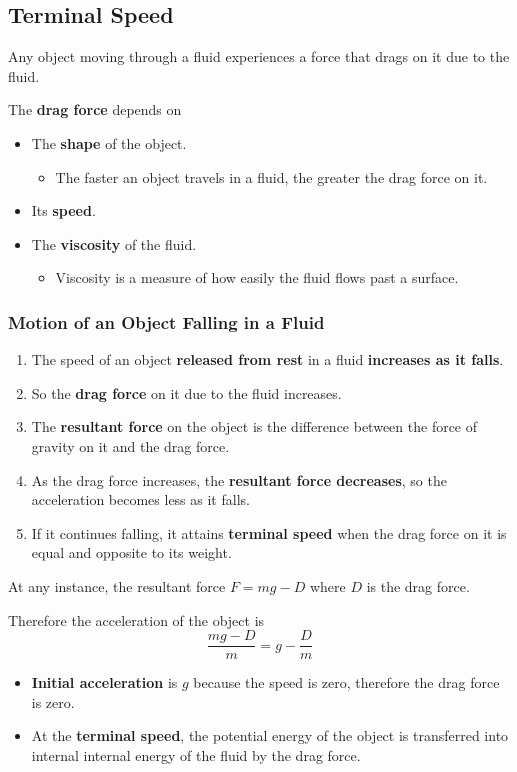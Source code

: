 \subsection{Terminal Speed}

Any object moving through a fluid experiences a force that drags on it due to the fluid.

The \textbf{drag force} depends on
\begin{itemize}
    \item The \textbf{shape} of the object.
        \begin{itemize}
            \item The faster an object travels in a fluid, the greater the drag force on it.
        \end{itemize}
    \item Its \textbf{speed}.
    \item The \textbf{viscosity} of the fluid.
        \begin{itemize}
            \item Viscosity is a measure of how easily the fluid flows past a surface.
        \end{itemize}
\end{itemize}

\subsubsection*{Motion of an Object Falling in a Fluid}

\begin{enumerate}
    \item The speed of an object \textbf{released from rest} in a fluid \textbf{increases as it falls}.
    \item So the \textbf{drag force} on it due to the fluid increases.
    \item The \textbf{resultant force} on the object is the difference between the force of gravity on it and the drag force.
    \item As the drag force increases, the \textbf{resultant force decreases}, so the acceleration becomes less as it falls.
    \item If it continues falling, it attains \textbf{terminal speed} when the drag force on it is equal and opposite to its weight.
\end{enumerate}

At any instance, the resultant force $F=mg-D$ where $D$ is the drag force.

Therefore the acceleration of the object is
$$\frac{mg-D}{m}=g-\frac{D}{m}$$
\begin{itemize}
    \item \textbf{Initial acceleration} is $g$ because the speed is zero, therefore the drag force is zero.
    \item At the \textbf{terminal speed}, the potential energy of the object is transferred into internal internal energy of the fluid by the drag force.
\end{itemize}

